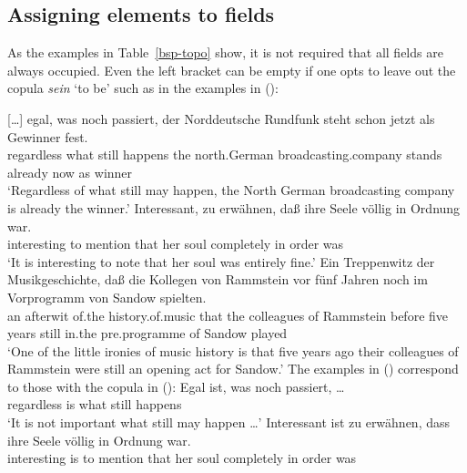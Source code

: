 {\subsection{Assigning elements to fields}

As the examples in Table~\ref{bsp-topo} show, it is not required that all fields are always occupied. Even the left bracket can be empty if one opts to leave out
the copula \emph{sein} `to be' such as in the examples in ():
\eal
\ex

{}[\ldots]
\gll egal,      was  noch  passiert, der Norddeutsche Rundfunk             steht  schon   jetzt als Gewinner fest.\footnotemark\\
     regardless what still happens the north.German broadcasting.company stands already now as winner \particle\\
\glt `Regardless of what still may happen, the North German broadcasting company is already the winner.'
\ex 
\gll Interessant, zu erwähnen, daß ihre Seele völlig    in Ordnung war.\footnotemark\\
	 interesting to mention that her soul completely in order was\\
\glt `It is interesting to note that her soul was entirely fine.'
\ex
\gll Ein Treppenwitz der    Musikgeschichte, daß die Kollegen   von Rammstein vor    fünf Jahren noch im      Vorprogramm   von Sandow spielten.\footnotemark\\
	 an afterwit of.the history.of.music that the colleagues of Rammstein before five years still in.the pre.programme of Sandow played\\
\glt `One of the little ironies of music history is that five years ago their colleagues of Rammstein
were still an opening act for Sandow.'
\zl
The examples in () correspond to those with the copula in ():
\eal
\ex 
\gll Egal ist, was noch passiert, \ldots\\
     regardless is	 what still happens \\
\glt `It is not important what still may happen \ldots'
\ex
\gll Interessant ist zu erwähnen, dass ihre Seele völlig in Ordnung war.\\
	 interesting is to mention that her soul completely in order was\\
}
